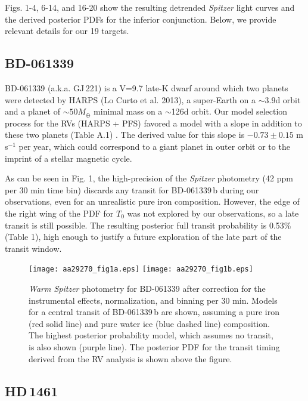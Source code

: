 \documentclass[traditabstract]{aa}
\newcommand{\ms}{\mbox{m\,s$^{-1}$} }
\begin{document}
Figs. 1-4, 6-14, and 16-20 show the resulting detrended {\it Spitzer} light curves and the derived posterior PDFs for the inferior conjunction. Below, we provide relevant details for our 19 targets.

\subsection{BD-061339}

BD-061339 (a.k.a. GJ\,221) is a V=9.7 late-K dwarf around which two planets were detected by HARPS (Lo Curto et al. 2013),  a super-Earth on a $\sim$3.9d orbit and a planet of $\sim 50 M_\oplus$ minimal mass on a $\sim$126d orbit.
Our model selection process for the RVs (HARPS + PFS) favored a model with a slope in addition to these two planets (Table A.1) . The derived value for this slope is $-0.73 \pm 0.15$ \ms per year,  which could correspond to a giant planet in outer orbit or to the imprint of a stellar magnetic cycle. 

As can be seen in Fig. 1, the high-precision of the {\it Spitzer} photometry (42 ppm per 30 min time bin) discards any transit 
for BD-061339\,b during our observations,  even for an unrealistic pure iron composition. However, the edge of the right wing
 of the PDF for $T_0$ was not explored by our observations, so a late transit is still possible. The resulting posterior full 
 transit probability is 0.53\% (Table 1), high enough to justify a future exploration of the late part of the transit window. 


\begin{figure}
\label{fig:1}
\centering                     
\texttt{[image: aa29270\_fig1a.eps]}
\texttt{[image: aa29270\_fig1b.eps]}
\caption{{\it Warm Spitzer} photometry for BD-061339 after correction for the instrumental effects, normalization, and 
binning per 30 min. Models for a central transit of BD-061339\,b are shown, assuming a pure iron (red solid line) and pure 
water ice (blue dashed line) composition. The highest posterior probability model, which assumes no transit, is also shown (purple line). The posterior PDF for the transit timing derived from the RV analysis is shown above the figure.}
\end{figure}

\subsection{HD\,1461}
\end{document}
